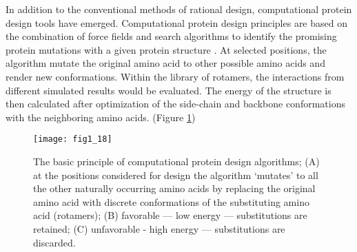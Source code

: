\begin{refsection}
In addition to the conventional methods of rational design, computational
protein design tools have emerged. Computational protein design principles
are based on the combination of force fields and search algorithms to
identify the promising protein mutations with a given protein structure
\cite{VanDerSloot2009a}. At selected positions, the algorithm mutate the
original amino acid to other possible amino acids and render new conformations.
Within the library of rotamers, the interactions from different simulated
results would be evaluated. The energy of the structure is then calculated
after optimization of the side-chain and backbone conformations with the
neighboring amino acids\cite{VanDerSloot2009a}. (Figure \ref{fig:cpd})
\begin{figure}[htbp] \centering \texttt{[image: fig1\_18]}
    \caption[The basic principle of computational protein design algorithms;
        (A) at the positions considered for design the algorithm ‘mutates’ to
        all the other naturally occurring amino acids by replacing the original
        amino acid with discrete conformations of the substituting amino acid
        (rotamers); (B) favorable — low energy — substitutions are retained;
        (C) unfavorable - high energy — substitutions are discarded.]{The basic
            principle of computational protein design algorithms; (A) at the
            positions considered for design the algorithm ‘mutates’ to all the
            other naturally occurring amino acids by replacing the original
            amino acid with discrete conformations of the substituting amino
            acid (rotamers); (B) favorable — low energy — substitutions are
            retained; (C) unfavorable - high energy — substitutions are
            discarded\cite{VanDerSloot2009a}.} 
    \label{fig:cpd} 
\end{figure}


\end{refsection}
